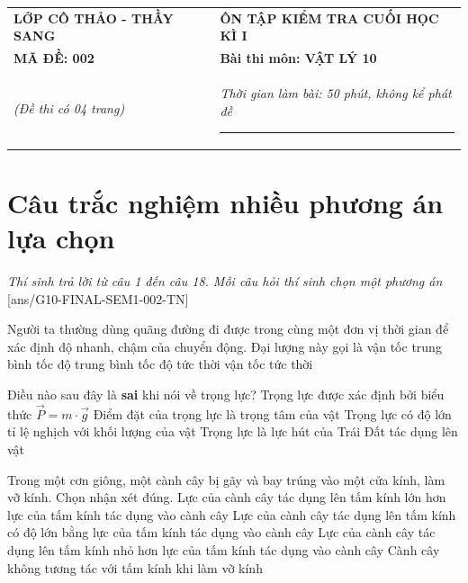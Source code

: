 \begin{center}
	\begin{tabular}{M{9.25cm}M{8.75cm}}
		\textbf{LỚP CÔ THẢO - THẦY SANG}& \textbf{ÔN TẬP KIỂM TRA CUỐI HỌC KÌ I}\\
		\textbf{MÃ ĐỀ: 002}& \textbf{Bài thi môn: VẬT LÝ 10}\\
		\textit{(Đề thi có 04 trang)}& \textit{Thời gian làm bài: 50 phút, không kể phát đề}
		\noindent\rule{4cm}{0.8pt} \\
	\end{tabular}
\end{center}
\setcounter{section}{0}
\vspace{-1cm}
\section{Câu trắc nghiệm nhiều phương án lựa chọn}
\textit{Thí sinh trả lời từ câu 1 đến câu 18. Mỗi câu hỏi thí sinh chọn một phương án}
\setcounter{ex}{0}
[ans/G10-FINAL-SEM1-002-TN]
\begin{ex}
	Người ta thường dùng quãng đường đi được trong cùng một đơn vị thời gian để xác định độ nhanh, chậm của chuyển động. Đại lượng này gọi là
	\choice
	{vận tốc trung bình}
	{\True tốc độ trung bình}
	{tốc độ tức thời}
	{vận tốc tức thời}
	\loigiai{}
\end{ex}
\begin{ex}
	Điều nào sau đây là \textbf{sai} khi nói về trọng lực?
	\choice
	{Trọng lực được xác định bởi biểu thức $\vec{P}=m\cdot\vec{g}$}
	{Điểm đặt của trọng lực là trọng tâm của vật}
	{\True Trọng lực có độ lớn tỉ lệ nghịch với khối lượng của vật}
	{Trọng lực là lực hút của Trái Đất tác dụng lên vật}
	\loigiai{}
\end{ex}
\begin{ex}
	Trong một cơn giông, một cành cây bị gãy và bay trúng vào một cửa kính, làm vỡ kính. Chọn nhận xét đúng.	
	\choice
	{Lực của cành cây tác dụng lên tấm kính lớn hơn lực của tấm kính tác dụng vào cành cây}
	{\True Lực của cành cây tác dụng lên tấm kính có độ lớn bằng lực của tấm kính tác dụng vào cành cây}
	{Lực của cành cây tác dụng lên tấm kính nhỏ hơn lực của tấm kính tác dụng vào cành cây}
	{Cành cây không tương tác với tấm kính khi làm vỡ kính}
	\loigiai{}
\end{ex}
